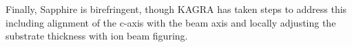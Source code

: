 Finally, Sapphire is birefringent, though KAGRA has taken steps to address this including alignment of the c-axis with the beam axis and locally adjusting the substrate thickness with ion beam figuring.  






